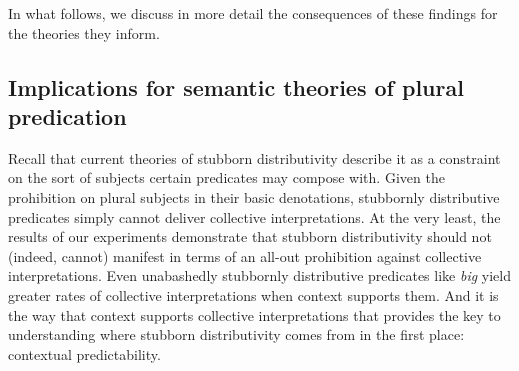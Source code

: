 \documentclass[linguex]{sp}
\newcommand{\ndg}[1]{\textcolor{Green}{[ndg: #1]}}
\begin{document}
In what follows, we discuss in more detail the consequences of these findings for the theories they inform.

\subsection{Implications for semantic theories of plural predication}



Recall that current theories of stubborn distributivity describe it as a constraint on the sort of subjects certain predicates may compose with. 
Given the prohibition on plural subjects in their basic denotations, stubbornly distributive predicates simply cannot deliver collective interpretations. At the very least, the results of our experiments demonstrate that stubborn distributivity should not (indeed, cannot) manifest in terms of an all-out prohibition against collective interpretations. Even unabashedly stubbornly distributive predicates like \emph{big} yield greater rates of collective interpretations when context supports them. And it is the way that context supports collective interpretations that provides the key to understanding where stubborn distributivity comes from in the first place: contextual predictability.
\end{document}
